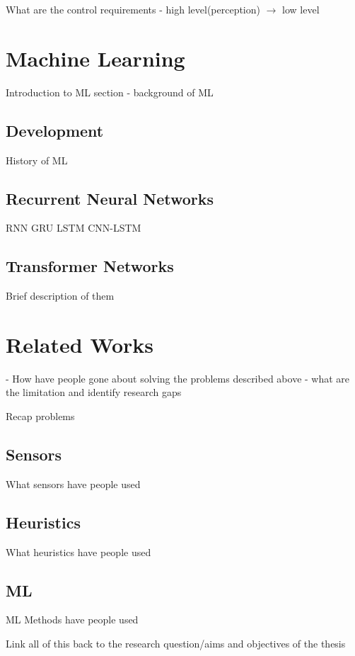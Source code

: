 What are the control requirements - high level(perception) $\rightarrow$ low level\cite{Tucker2015}


\section{Machine Learning}
Introduction to ML section - background of ML

\subsection{Development}
History of ML

\subsection{Recurrent Neural Networks}
RNN
GRU
LSTM
CNN-LSTM

\subsection{Transformer Networks}
Brief description of them


\section{Related Works} - %
How have people gone about solving the problems described above - what are the limitation and identify research gaps

Recap problems

\subsection{Sensors}
What sensors have people used

\subsection{Heuristics}
What heuristics have people used

\subsection{ML} %
ML Methods have people used


Link all of this back to the research question/aims and objectives of the thesis

